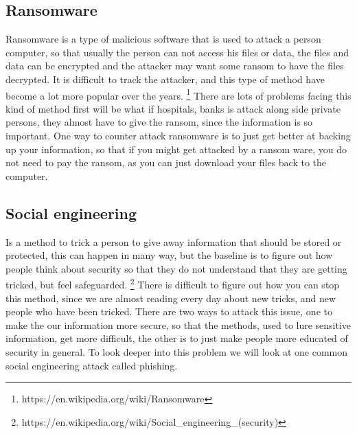 \documentclass{article}
\begin{document}
\subsection{Ransomware} 
Ransomware is a type of malicious software that is used to attack a person computer, so that usually the person can not access his files or data, the files and data can be encrypted and the attacker may want some ransom to have the files decrypted. It is difficult to track the attacker, and this type of method have become a lot more popular over the years. \footnote{https://en.wikipedia.org/wiki/Ransomware} There are lots of problems facing this kind of method first will be what if hospitals, banks is attack along side private persons, they almost have to give the ransom, since the information is so important. One way to counter attack ransomware is to just get better at backing up your information, so that if you might get attacked by a ransom ware, you do not need to pay the ransom, as you can just download your files back to the computer.


\subsection{Social engineering} 
Is a method to trick a person to give away information that should be stored or protected, this can happen in many way, but the baseline is to figure out how people think about security so that they do not understand that they are getting tricked, but feel safeguarded. \footnote{https://en.wikipedia.org/wiki/Social\_engineering\_(security)} There is difficult to figure out how you can stop this method, since we are almost reading every day about new tricks, and new people who have been tricked. There are two ways to attack this issue, one to make the our information more secure, so that the methods, used to lure sensitive information, get more difficult, the other is to just make people more educated of security in general. To look deeper into this problem we will look at one common social engineering attack called phishing.
\end{document}
